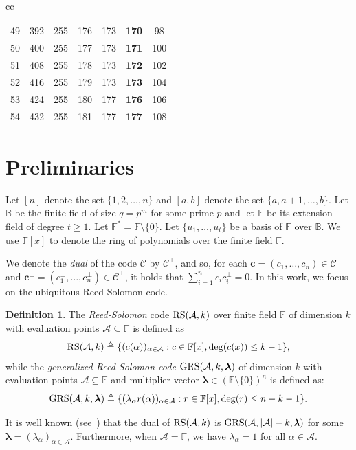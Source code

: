 \documentclass[onecolumn]{IEEEtran}
\theoremstyle{plain}
\theoremstyle{definition}
\newtheorem{definition}{Definition}
\newcommand{\FF}{\mathbb{F}}
\newcommand{\BB}{\mathbb{B}}
\newcommand{\cA}{\mathcal{A}}
\newcommand{\cC}{\mathcal{C}}
\newcommand{\vlambda}{{\pmb{\lambda}}}
\newcommand{\rs}{{\rm RS}}
\newcommand{\grs}{{\rm GRS}}
\begin{document}
\begin{table}[h!]
\begin{tabular}{cc}
\begin{tabular}[t]{c c c c c c c}
            49 & 392 & 255 & 176 & 173 & \textbf{170} & 98 \\
            50 & 400 & 255 & 177 & 173 & \textbf{171} & 100 \\
            51 & 408 & 255 & 178 & 173 & \textbf{172} & 102 \\
            52 & 416 & 255 & 179 & 173 & \textbf{173} & 104 \\
            53 & 424 & 255 & 180 & 177 & \textbf{176} & 106 \\
            54 & 432 & 255 & 181 & 177 & \textbf{177} & 108 \\
            \bottomrule
        \end{tabular}
    \end{tabular}
\end{table}
\section{Preliminaries}\label{sec:prelim}

Let $[n]$ denote the set $\{1,2,\ldots,n\}$ and $[a,b]$ denote the set $\{a,a+1,\ldots, b\}$. Let $\BB$ be the finite field of size $q = p^m$ for some prime $p$ and let $\FF$ be its extension field of degree $t\ge 1$. Let $\FF^* = \FF\setminus\{0\}$. Let $\{u_1,\ldots,u_t\}$ be a basis of $\FF$ over $\BB$. We use $\FF[x]$ to denote the ring of polynomials over the finite field $\FF$.

We denote the {\em dual} of the code $\cC$ by $\cC^\perp$, and so, %
for each $\boldsymbol{c} = (c_1,\ldots,c_n)\in\cC$ and $\boldsymbol{c}^{\perp} = (c_1^\perp,\ldots,c_n^\perp)\in\cC^\perp$, it holds that $\sum_{i=1}^nc_ic_i^\perp = 0$. In this work, we focus on the ubiquitous Reed-Solomon code.

\begin{definition}
    The \textit{Reed-Solomon} code $\rs(\cA,k)$ over finite field $\FF$ of dimension $k$ with evaluation points $\cA\subseteq\FF$ is defined as
    $$
    \rs(\cA,k)\triangleq \{(c(\alpha))_{\alpha\in\cA}:c\in\FF[x],\deg(c(x))\le k-1\},
    $$
    while the \textit{generalized Reed-Solomon code} $\grs(\cA,k,\boldsymbol{\lambda})$ of dimension $k$ with evaluation points $\cA\subseteq \FF$ and multiplier vector $\boldsymbol{\lambda}\in(\FF\setminus\{0\})^n$ is defined as:
    $$
    \grs(\cA,k,\boldsymbol{\lambda}) \triangleq \{(\lambda_\alpha r(\alpha))_{\alpha\in\cA}:r\in\FF[x],\deg(r)\le n-k-1\}.
    $$
\end{definition}
\noindent It is well known (see~\cite{roth2006}) that the dual of $\rs(\cA,k)$ is $\grs(\cA,|\cA|-k,\vlambda)$ for some $\vlambda=(\lambda_{\alpha})_{\alpha\in \cA}$.
Furthermore, when $\cA = \FF$, we have $\lambda_\alpha = 1$ for all $\alpha\in\cA$.
\end{document}
